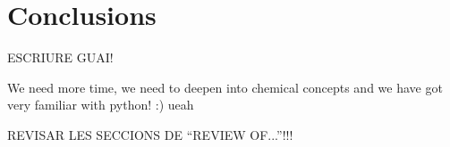 \documentclass[a4paper,10pt]{article}
\theoremstyle{plain}
\theoremstyle{definition}
\theoremstyle{remark}
\newcommand{\quotes}[1]{``#1''}
\begin{document}
\section{Conclusions}
{\color{red}ESCRIURE GUAI!

We need more time, we need to deepen into chemical concepts and we have got very familiar with python! :) ueah

REVISAR LES SECCIONS DE \quotes{REVIEW OF...}!!!}
\end{document}
